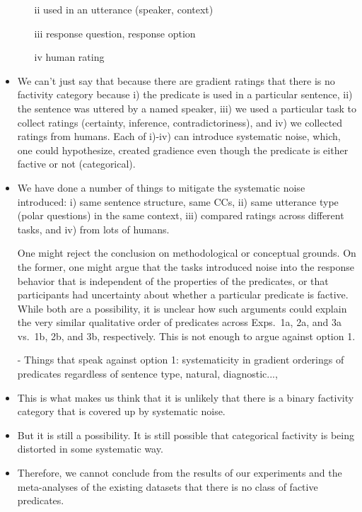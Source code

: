 \documentclass[11pt,fleqn]{article}
\newcommand{\6}{\mbox{$[\hspace*{-.6mm}[$}}
\newcommand{\9}{\mbox{$]\hspace*{-.6mm}]$}}
\begin{document}
\begin{itemize}
\begin{enumerate}
\item[ii] used in an utterance (speaker, context)

\item[iii] response question, response option

\item[iv] human rating

\end{enumerate}

\item We can't just say that because there are gradient ratings that there is no factivity category because i) the predicate is used in a particular sentence, ii) the sentence was uttered by a named speaker, iii) we used a particular task to collect ratings (certainty, inference, contradictoriness), and iv) we collected ratings from humans. Each of i)-iv) can introduce systematic noise, which, one could hypothesize, created gradience even though the predicate is either factive or not (categorical).

\item We have done a number of things to mitigate the systematic noise introduced: i) same sentence structure, same CCs, ii) same utterance type (polar questions) in the same context, iii) compared ratings across different tasks, and iv) from lots of humans.

One might reject the conclusion on methodological or conceptual grounds. On the former, one might argue that the tasks introduced noise into the response behavior that is independent of the properties of the predicates, or that participants had uncertainty about whether a particular predicate is factive. While both are a possibility,  it is unclear how such arguments could explain the very similar qualitative order of predicates across  Exps.~1a, 2a, and 3a vs.~1b, 2b, and 3b, respectively. This is not enough to argue against option 1.

- Things that speak against option 1: systematicity in gradient orderings of predicates regardless of sentence type, natural, diagnostic...,

\item This is what makes us think that it is unlikely that there is a binary factivity category that is covered up by systematic noise.

\item But it is still a possibility. It is still possible that categorical factivity is being distorted in some systematic way.  

\item Therefore, we cannot conclude from the results of our experiments and the meta-analyses of the existing datasets that there is no class of factive predicates. 


\end{itemize}
\end{document}

